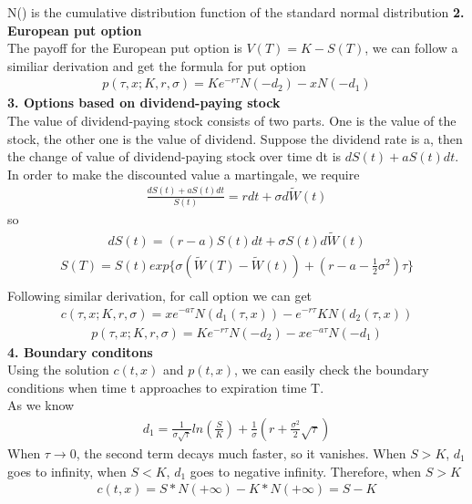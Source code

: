 \documentclass[a4paper]{article}
\begin{document}
N() is the cumulative distribution function of the standard normal distribution
{\bf 2. European put option}\\
The payoff for the European put option is $V(T) = K - S(T)$, we can follow a similiar derivation and get the formula for put option
\begin{align*}
	p(\tau,x; K, r, \sigma) = Ke^{-r\tau}N(-d_2)-xN(-d_1)
\end{align*}
{\bf 3. Options based on dividend-paying stock}\\
The value of dividend-paying stock consists of two parts. One is the value of the stock, the other one is the value of dividend. Suppose the dividend rate is a, then the change of value of dividend-paying stock over time dt is $dS(t) + aS(t)dt$. In order to make the discounted value a martingale, we require 
\begin{align*}
	\frac{dS(t) + aS(t)dt}{S(t)} = rdt + \sigma d \tilde W(t)
\end{align*}
so
\begin{align*}
	dS(t) = (r-a) S(t)dt + \sigma S(t) d \tilde W(t)
\end{align*}
\begin{align*}
	S(T) = S(t) exp\{\sigma(\tilde W(T) -\tilde W(t)) + (r - a - \frac{1}{2} \sigma^2) \tau\} \\
\end{align*}
Following similar derivation, for call option we can get
\begin{align*}
	c(\tau,x; K, r, \sigma) = xe^{-a\tau} N(d_1(\tau,x)) - e^{-r\tau} K N(d_2(\tau,x))
\end{align*}
\begin{align*}
	p(\tau,x; K, r, \sigma) = Ke^{-r\tau} N(-d_2)-xe^{-a \tau}N(-d_1)
\end{align*}
{\bf 4. Boundary conditons}\\
Using the solution $c(t,x)$ and $p(t,x)$, we can easily check the boundary conditions when
time t approaches to expiration time T.\\
As we know
\begin{align*}
	d_1 = \frac{1}{\sigma \sqrt{\tau}}ln(\frac{S}{K}) 
	+ \frac{1}{\sigma}(r+\frac{\sigma^2}{2}\sqrt{\tau})
\end{align*}
When $\tau \to 0$, the second term decays much faster, so it vanishes. When $S>K$, $d_1$ goes to infinity, when $S<K$, $d_1$ goes to negative infinity.
Therefore, when $S>K$
\begin{align*}
	c(t,x) = S*N(+\infty) - K*N(+\infty) = S-K
\end{align*}
\end{document}

